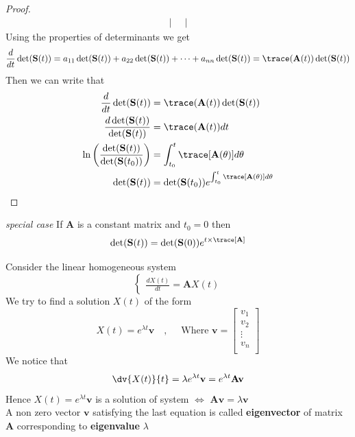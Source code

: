 \begin{proof}[\textcolor{theme}{Proof}]
\begin{align*}
\begin{vmatrix}
        \end{vmatrix}
    \end{align*}
    Using the properties of determinants we get
    \[
        \frac{d}{dt} \det(\mathbf{S}(t)) = a_{11}\det(\mathbf{S}(t)) + a_{22}\det(\mathbf{S}(t)) +\dots+a_{nn}\det(\mathbf{S}(t)) = \trace(\mathbf{A}(t))\det(\mathbf{S}(t))
    \]
    Then we can write that
    \begin{align*}
        \frac{d}{dt} \det(\mathbf{S}(t))                                     & = \trace(\mathbf{A}(t))\det(\mathbf{S}(t))
        \\
        \frac{d \det(\mathbf{S}(t))}{\det(\mathbf{S}(t))}                    & = \trace(\mathbf{A}(t)) dt
        \\
        \ln \left( \frac{\det(\mathbf{S}(t))}{\det(\mathbf{S}(t_0))} \right) & = \int_{t_0}^{t}\trace[\mathbf{A}(\theta)]d\theta
        \\
        \det(\mathbf{S}(t))                                                  & = \det(\mathbf{S}(t_0))e^{\int_{t_0}^{t}\trace[\mathbf{A}(\theta)]d\theta}
    \end{align*}
\end{proof}
\begin{enrichment*}{\textit{special case}}
    If $\mathbf{A}$ is a constant matrix and $t_0=0$ then
\[
    \det(\mathbf{S}(t)) = \det(\mathbf{S}(0))e^{t \times \trace[\mathbf{A}]}
\]
\end{enrichment*}
\newpage
Consider the linear homogeneous system
\begin{equation}
    \begin{cases}
        \displaystyle \frac{dX(t)}{dt} = \mathbf{A}X(t)
    \end{cases}
\end{equation}
We try to find a solution $X(t)$ of the form
\[
    X(t) = e^{\lambda t} \mathbf{v}    \quad,\quad \text{ Where }\mathbf{v} = 
    \begin{bmatrix}
        v_{1}  \\
        v_{2}  \\
        \vdots \\
        v_{n}  \\
    \end{bmatrix}
\]
We notice that
$$\dv{X(t)}{t} = \lambda e^{\lambda t} \mathbf{v} = e^{\lambda t}\mathbf{A}\mathbf{v}$$
Hence $X(t)=e^{\lambda t}\mathbf{v}$ is a solution of system $\iff$ $\mathbf{A}\mathbf{v}=\lambda \mathbf{v}$\\
A non zero vector $\mathbf{v}$ satisfying the last equation is called \textbf{eigenvector} of matrix $\mathbf{A}$ corresponding to \textbf{eigenvalue} $\lambda$
